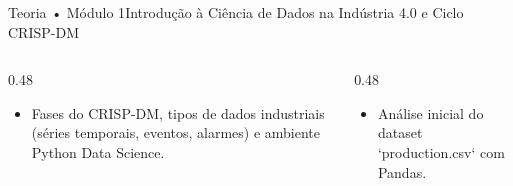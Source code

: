 \begin{senaiframe}{Teoria • Módulo 1}{Introdução à Ciência de Dados na Indústria 4.0 e Ciclo CRISP-DM}
  \begin{columns}[t]
    \begin{column}{0.48\textwidth}
      \begin{tcolorbox}[senaibluecard, title={Fundamentos Teóricos}]
        \begin{itemize}
          \item Fases do CRISP-DM, tipos de dados industriais (séries temporais, eventos, alarmes) e ambiente Python Data Science.
        \end{itemize}
      \end{tcolorbox}
    \end{column}
    \begin{column}{0.48\textwidth}
      \begin{tcolorbox}[senaigreencard, title={Prática \& Laboratório}]
        \begin{itemize}
          \item Análise inicial do dataset `production.csv` com Pandas.
        \end{itemize}
      \end{tcolorbox}
    \end{column}
  \end{columns}
\end{senaiframe}
